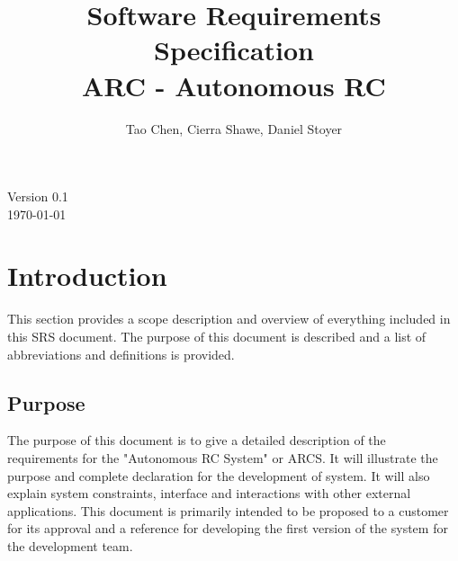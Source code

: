 \documentclass[draftclsnofoot,onecolumn,10pt]{IEEEtran}
\date{}
\begin{document}
\begin{titlepage}
	\title{Software Requirements Specification\\
	ARC - Autonomous RC}
	\author{Tao Chen, Cierra Shawe, Daniel Stoyer}
	\maketitle
	\begin{center}
	Version 0.1\\
	\vspace{1.9cm}
	\today
	\end{center}

	\thispagestyle{empty} %
	
\end{titlepage}

\tableofcontents

\newpage

\section{Introduction} %
This section provides a scope description and overview of everything included 
in this SRS document. The purpose of this document is described and a list of 
abbreviations and definitions is provided.

\subsection{Purpose} %
The purpose of this document is to give a detailed description of the requirements 
for the "Autonomous RC System" or ARCS. It will illustrate the purpose and 
complete declaration for the development of system. It will also explain system 
constraints, interface and interactions with other external applications. This document 
is primarily intended to be proposed to a customer for its approval and a reference for 
developing the first version of the system for the development team.
\end{document}

